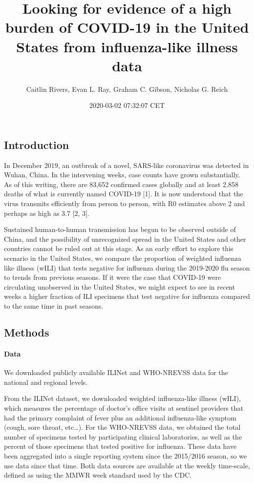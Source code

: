\documentclass[]{article}
\title{Looking for evidence of a high burden of COVID-19 in the United States
from influenza-like illness data}
\author{Caitlin Rivers, Evan L. Ray, Graham C. Gibson, Nicholas G. Reich}
\date{2020-03-02 07:32:07 CET}
\let\oldparagraph\paragraph
\renewcommand{\paragraph}[1]{\oldparagraph{#1}\mbox{}}
\begin{document}
\maketitle

\hypertarget{introduction}{%
\subsection{Introduction}\label{introduction}}

In December 2019, an outbreak of a novel, SARS-like coronavirus was
detected in Wuhan, China. In the intervening weeks, case counts have
grown substantially. As of this writing, there are 83,652 confirmed
cases globally and at least 2,858 deaths of what is currently named
COVID-19 {[}1{]}. It is now understood that the virus transmits
efficiently from person to person, with R0 estimates above 2 and perhaps
as high as 3.7 {[}2, 3{]}.

Sustained human-to-human transmission has begun to be observed outside
of China, and the possibility of unrecognized spread in the United
States and other countries cannot be ruled out at this stage. As an
early effort to explore this scenario in the United States, we compare
the proportion of weighted influenza like illness (wILI) that tests
negative for influenza during the 2019-2020 flu season to trends from
previous seasons. If it were the case that COVID-19 were circulating
unobserved in the United States, we might expect to see in recent weeks
a higher fraction of ILI specimens that test negative for influenza
compared to the same time in past seasons.

\hypertarget{methods}{%
\subsection{Methods}\label{methods}}

\hypertarget{data}{%
\paragraph{Data}\label{data}}

We downloaded publicly available ILINet and WHO-NREVSS data for the
national and regional levels.

From the ILINet dataset, we downloaded weighted influenza-like illness
(wILI), which measures the percentage of doctor's office visits at
sentinel providers that had the primary complaint of fever plus an
additional influenza-like symptom (cough, sore throat, etc\ldots{}). For
the WHO-NREVSS data, we obtained the total number of specimens tested by
participating clinical laboratories, as well as the percent of those
specimens that tested positive for influenza. These data have been
aggregated into a single reporting system since the 2015/2016 season, so
we use data since that time. Both data sources are available at the
weekly time-scale, defined as using the MMWR week standard used by the
CDC.
\end{document}

